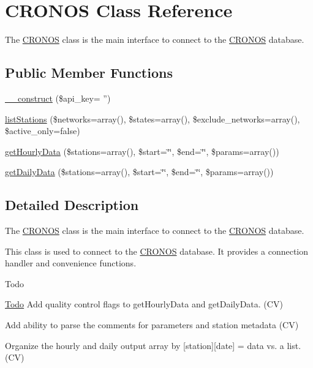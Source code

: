 \hypertarget{class_c_r_o_n_o_s}{
\section{\-C\-R\-O\-N\-O\-S \-Class \-Reference}
\label{class_c_r_o_n_o_s}
}


\-The \hyperlink{class_c_r_o_n_o_s}{\-C\-R\-O\-N\-O\-S} class is the main interface to connect to the \hyperlink{class_c_r_o_n_o_s}{\-C\-R\-O\-N\-O\-S} database.  


\subsection*{\-Public \-Member \-Functions}
\begin{DoxyCompactItemize}
\item 
\hyperlink{class_c_r_o_n_o_s_a47956f738738b2bfb695aaf95eb28baf}{\-\_\-\-\_\-construct} (\$api\-\_\-key= '')
\item 
\hyperlink{class_c_r_o_n_o_s_ad64f4ec196f102f4e1e3c68bdf4b9656}{list\-Stations} (\$networks=array(), \$states=array(), \$exclude\-\_\-networks=array(), \$active\-\_\-only=false)
\item 
\hyperlink{class_c_r_o_n_o_s_aedba3a0b213df6019596727d2f2efe0d}{get\-Hourly\-Data} (\$stations=array(), \$start=\char`\"{}\char`\"{}, \$end=\char`\"{}\char`\"{}, \$params=array())
\item 
\hyperlink{class_c_r_o_n_o_s_a0c55f7f231d4130170d1b0c7d5dda0e5}{get\-Daily\-Data} (\$stations=array(), \$start=\char`\"{}\char`\"{}, \$end=\char`\"{}\char`\"{}, \$params=array())
\end{DoxyCompactItemize}


\subsection{\-Detailed \-Description}
\-The \hyperlink{class_c_r_o_n_o_s}{\-C\-R\-O\-N\-O\-S} class is the main interface to connect to the \hyperlink{class_c_r_o_n_o_s}{\-C\-R\-O\-N\-O\-S} database. 

\-This class is used to connect to the \hyperlink{class_c_r_o_n_o_s}{\-C\-R\-O\-N\-O\-S} database. \-It provides a connection handler and convenience functions.

\begin{DoxyRefDesc}{\-Todo}
\item[\hyperlink{todo__todo000001}{\-Todo}]\-Add quality control flags to get\-Hourly\-Data and get\-Daily\-Data. (\-C\-V) 

\-Add ability to parse the comments for parameters and station metadata (\-C\-V) 

\-Organize the hourly and daily output array by \mbox{[}station\mbox{]}\mbox{[}date\mbox{]} = data vs. a list. (\-C\-V) \end{DoxyRefDesc}


